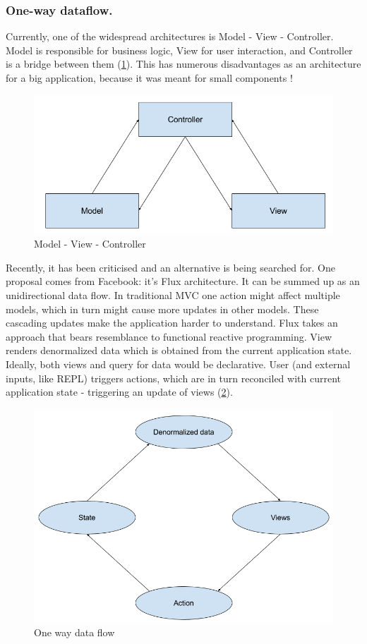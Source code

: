 \documentclass[11pt]{scrartcl}
\begin{document}
\subsubsection{One-way dataflow.}
Currently, one of the widespread architectures is Model - View - Controller. Model is responsible for business logic, View for user interaction, and Controller is a bridge between them (\ref{mvc}). This has numerous disadvantages as an architecture for a big application, because it was meant for small components \cite{Krasner:1988:CUM:50757.50759}!
\begin{figure}[hbt]
  \includegraphics[scale=0.3]{img/MVC}
  \caption{Model - View - Controller}
  \label{mvc}
\end{figure}

Recently, it has been criticised and an alternative is being searched for. One proposal comes from Facebook: it’s Flux architecture. It can be summed up as an unidirectional data flow. In traditional MVC one action might affect multiple models, which in turn might cause more updates in other models. These cascading updates make the application harder to understand. Flux takes an approach that bears resemblance to functional reactive programming. View renders denormalized data which is obtained from the current application state. Ideally, both views and query for data would be declarative. User (and external inputs, like REPL) triggers actions, which are in turn reconciled with current application state - triggering an update of views (\ref{oneway}).
\begin{figure}[hbt]
  \includegraphics[scale=0.3]{img/OneWay}
  \caption{One way data flow}
  \label{oneway}
\end{figure}
\end{document}
